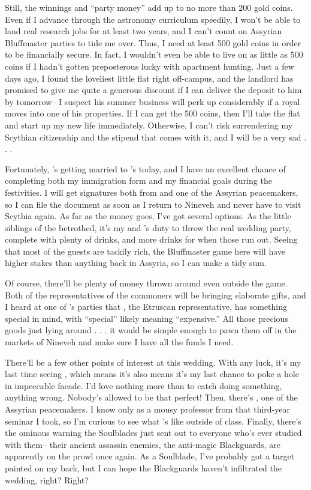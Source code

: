 \documentclass[char]{Kos}
\begin{document}
Still, the winnings and ``party money'' add up to no more than 200 gold coins. Even if I advance through the astronomy curriculum speedily, I won't be able to land real research jobs for at least two years, and I can't count on Assyrian Bluffmaster parties to tide me over. Thus, I need at least 500 gold coins in order to be financially secure. In fact, I wouldn't even be able to live on as little as 500 coins if I hadn't gotten preposterous lucky with apartment hunting. Just a few days ago, I found the loveliest little flat right off-campus, and the landlord has promised to give me quite a generous discount if I can deliver the deposit to him by tomorrow-- I suspect his summer business will perk up considerably if a royal moves into one of his properties. If I can get the 500 coins, then I'll take the flat and start up my new life immediately. Otherwise, I can't risk surrendering my Scythian citizenship and the stipend that comes with it, and I will be a very sad \cWard{\prince} . . .

Fortunately, \cBride{}'s getting married to \cPoet{}'s \cGroom{\sibling} \cGroom{} today, and I have an excellent chance of completing both my immigration form and my financial goals during the festivities. I will get signatures both from \cScythiaKing{} and one of the Assyrian peacemakers, so I can file the document as soon as I return to Nineveh and never have to visit Scythia again. As far as the money goes, I've got several options. As the little siblings of the betrothed, it's my and \cPoet{}'s duty to throw the real wedding party, complete with plenty of drinks, and more drinks for when those run out. Seeing that most of the guests are tackily rich, the Bluffmaster game here will have higher stakes than anything back in Assyria, so I can make a tidy sum.

Of course, there'll be plenty of money thrown around even outside the game. Both of the representatives of the commoners will be bringing elaborate gifts, and I heard at one of \cPoet{}'s parties that \cMerchant{}, the Etruscan representative, has something special in mind, with ``special'' likely meaning ``expensive.'' All those precious goods just lying around . . . it would be simple enough to pawn them off in the markets of Nineveh and make sure I have all the funds I need.

There'll be a few other points of interest at this wedding. With any luck, it's my last time seeing \cBride{}, which means it's also means it's my last chance to poke a hole in \cBride{\their} impeccable facade. I'd love nothing more than to catch \cBride{\them} doing something, anything wrong. Nobody's allowed to be that perfect! Then, there's \cAnarchist{}, one of the Assyrian peacemakers. I know \cAnarchist{} only as a mousy professor from that third-year seminar I took, so I'm curious to see what \cAnarchist{\they}'s like outside of class. Finally, there's the ominous warning the Soulblades just sent out to everyone who's ever studied with them-- their ancient assassin enemies, the anti-magic Blackguards, are apparently on the prowl once again. As a Soulblade, I've probably got a target painted on my back, but I can hope the Blackguards haven't infiltrated the wedding, right? Right?
\end{document}
